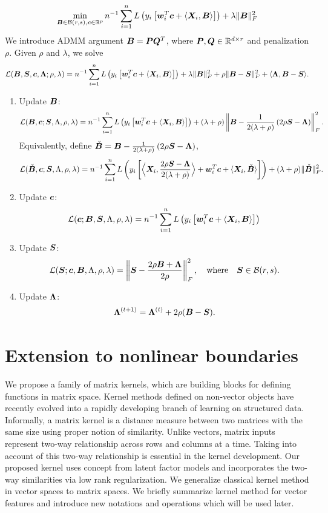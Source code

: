 \documentclass[12pt]{article}
\begin{document}
\[
\min_{\bm B\in\mathcal{B}(r,s), \bm{c}\in\mathbb{R}^p} n^{-1}\sum_{i=1}^nL\left(y_i\left[\bm{w}^T_i\bm{c}+\langle \bm X_i,\bm B\rangle \right]\right) + \lambda \lVert\bm B\rVert_F^2
\]
We introduce ADMM argument $\bm B=\bm{P}\bm{Q}^T$, where $\bm{P},\bm{Q}\in\mathbb{R}^{d\times r}$ and penalization $\rho$. 
Given $\rho$ and $\lambda$, we solve
\[
\mathcal{L}(\bm B,\bm S, \bm{c}, \bm{\Lambda}; \rho, \lambda)=n^{-1}\sum_{i=1}^nL\left(y_i\left[\bm{w}^T_i\bm{c}+\langle \bm X_i,\bm B\rangle \right]\right) + \lambda \lVert\bm B\rVert_F^2+\rho\lVert\bm B-\bm S\rVert_F^2 + \langle \bm{\Lambda}, \bm B-\bm S\rangle.
\]
\begin{enumerate}
\item Update $\bm B$:
\[
\mathcal{L}(\bm B, \bm{c}; \bm S, \Lambda, \rho,\lambda) = n^{-1}\sum_{i=1}^nL\left(y_i\left[\bm{w}^T_i\bm{c}+\langle \bm X_i,\bm B\rangle \right]\right)  + (\lambda+\rho) \left\lVert\bm B-{1\over 2(\lambda+\rho)}\left(2\rho\bm S-\bm{\Lambda}\right)\right\rVert_F^2.
\]
Equivalently, define $\check{\bm B}=\bm B-{1\over 2(\lambda+\rho)}\left(2\rho\bm S-\bm{\Lambda}\right)$, 
\[
\mathcal{L}(\check {\bm B}, \bm{c}; \bm S, \Lambda, \rho,\lambda) = n^{-1}\sum_{i=1}^nL\left(y_i\left[\Big\langle \bm X_i, {2\rho\bm S-\bm{\Lambda}\over 2(\lambda+\rho)}\Big\rangle+\bm{w}^T_i\bm{c}+\langle \bm X_i,\check{\bm B}\rangle \right]\right)  + (\lambda+\rho)\lVert\check {\bm B}\rVert_F^2.
\]
\item Update $\bm{c}$:
\[
\mathcal{L}(\bm{c};\bm B, \bm S, \Lambda, \rho,\lambda) = n^{-1}\sum_{i=1}^nL\left(y_i\left[\bm{w}^T_i\bm{c}+\langle \bm X_i,\bm B\rangle \right]\right)
\]
\item Update $\bm S$:
\[
\mathcal{L}(\bm S; \bm{c}, \bm B, \Lambda, \rho,\lambda) = \left\lVert\bm S-{2\rho\bm B+\bm{\Lambda}\over 2\rho}\right\rVert_F^2, \quad \text{where}\quad \bm S\in\mathcal{B}(r,s).
\]
\item Update $\bm{\Lambda}$:
\[
\bm{\Lambda}^{(t+1)} = \bm{\Lambda}^{(t)}+2\rho(\bm B-\bm S).
\]
\end{enumerate}




\section{Extension to nonlinear boundaries}\label{sec:nonlinear}
We propose a family of matrix kernels, which are building blocks for defining functions in matrix space. Kernel methods defined on non-vector objects have recently evolved into a rapidly developing branch of learning on structured data. Informally, a matrix kernel is a distance measure between two matrices with the same size using proper notion of similarity. Unlike vectors, matrix inputs represent two-way relationship across rows and columns at a time. Taking into account of this two-way relationship is essential in the kernel development.
Our proposed kernel uses concept from latent factor models and incorporates the two-way similarities via low rank regularization. 
We generalize classical kernel method in vector spaces to matrix spaces. We briefly summarize kernel method for vector features and introduce new notations and operations which will be used later.
\end{document}
